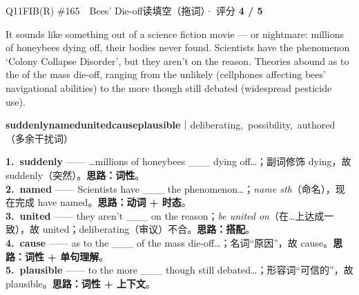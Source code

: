 \begin{qblock}{Q11\quad FIB(R) \#165\ \ Bees' Die-off}{读填空（拖词）· 评分 \textcolor{cAccent}{\bfseries 4 / 5}}
\begin{promptbox}
It sounds like something out of a science fiction movie --- or nightmare: millions of honeybees  dying off, their bodies never found. Scientists have  the phenomenon `Colony Collapse Disorder', but they aren't  on the reason. Theories abound as to the  of the mass die-off, ranging from the unlikely (cellphones affecting bees' navigational abilities) to the more  though still debated (widespread pesticide use).
\end{promptbox}
{\small \textbf{suddenly}\quad \textbf{named}\quad \textbf{united}\quad \textbf{cause}\quad \textbf{plausible}\quad ｜\quad deliberating,\ possibility,\ authored（多余干扰词）}
\begin{notebox}\footnotesize
\textbf{1.\ suddenly} —— …millions of honeybees \_\_\_ dying off…；副词修饰 dying，故 suddenly（突然）。\textbf{思路：词性}。\\[2pt]
\textbf{2.\ named} —— Scientists have \_\_\_ the phenomenon…；\emph{name sth}（命名），现在完成 have named。\textbf{思路：动词 + 时态}。\\[2pt]
\textbf{3.\ united} —— they aren't \_\_\_ on the reason；\emph{be united on}（在…上达成一致），故 united；deliberating（审议）不合。\textbf{思路：搭配}。\\[2pt]
\textbf{4.\ cause} —— as to the \_\_\_ of the mass die-off…；名词“原因”，故 cause。\textbf{思路：词性 + 单句理解}。\\[2pt]
\textbf{5.\ plausible} —— to the more \_\_\_ though still debated…；形容词“可信的”，故 plausible。\textbf{思路：词性 + 上下文}。
\end{notebox}
\end{qblock}

